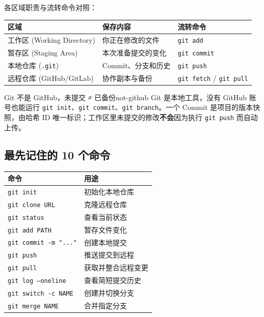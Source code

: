 \documentclass[12pt,a4paper]{ctexart}
\begin{document}
	各区域职责与流转命令对照：

	\begin{tabularx}{\linewidth}{l X l}
		\toprule
		\textbf{区域} & \textbf{保存内容} & \textbf{流转命令} \\
		\midrule
		工作区 (Working Directory) & 你正在修改的文件 & \texttt{git add} \\
		暂存区 (Staging Area) & 本次准备提交的变化 & \texttt{git commit} \\
		本地仓库 (\texttt{.git}) & Commit、分支和历史 & \texttt{git push} \\
		远程仓库 (GitHub/GitLab) & 协作副本与备份 & \texttt{git fetch} / \texttt{git pull} \\
		\bottomrule
	\end{tabularx}

	\begin{warning}{Git 不是 GitHub，未提交 ≠ 已备份}{not-github}
		Git 是本地工具，没有 GitHub 账号也能运行 \texttt{git init}、\texttt{git commit}、\texttt{git branch}。一个 Commit 是项目的版本快照，由哈希 ID 唯一标识；工作区里未提交的修改\textbf{不会}因为执行 \texttt{git push} 而自动上传。
	\end{warning}

	\subsection{最先记住的 10 个命令}

	\begin{tabularx}{\linewidth}{l X}
		\toprule
		\textbf{命令} & \textbf{用途} \\
		\midrule
		\texttt{git init} & 初始化本地仓库 \\
		\texttt{git clone URL} & 克隆远程仓库 \\
		\texttt{git status} & 查看当前状态 \\
		\texttt{git add PATH} & 暂存文件变化 \\
		\texttt{git commit -m "..."} & 创建本地提交 \\
		\texttt{git push} & 推送提交到远程 \\
		\texttt{git pull} & 获取并整合远程变更 \\
		\texttt{git log --oneline} & 查看简短提交历史 \\
		\texttt{git switch -c NAME} & 创建并切换分支 \\
		\texttt{git merge NAME} & 合并指定分支 \\
		\bottomrule
	\end{tabularx}
\end{document}
